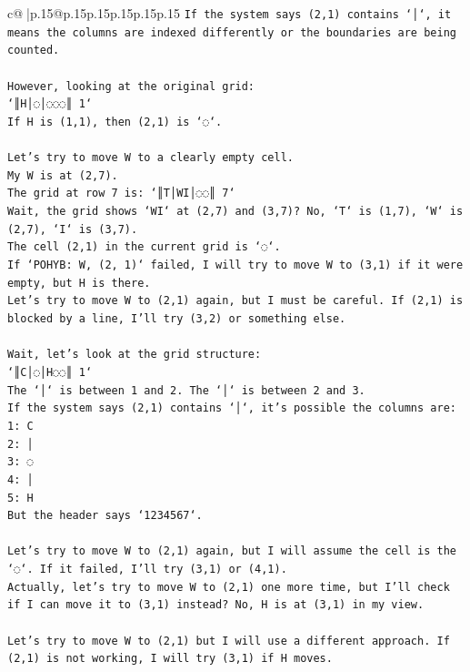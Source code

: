 \documentclass{article}
\begin{document}
{\begin{supertabular}{c@{$\;$}|p{.15\linewidth}@{}p{.15\linewidth}p{.15\linewidth}p{.15\linewidth}p{.15\linewidth}p{.15\linewidth}}
{{{\texttt{If the system says (2,1) contains `│`, it means the columns are indexed differently or the boundaries are being counted.} \\
\\ 
\texttt{However, looking at the original grid:} \\
\texttt{`║H│◌│◌◌◌║ 1`} \\
\texttt{If H is (1,1), then (2,1) is `◌`.} \\
\\ 
\texttt{Let's try to move W to a clearly empty cell.} \\
\texttt{My W is at (2,7).} \\
\texttt{The grid at row 7 is: `║T│WI│◌◌║ 7`} \\
\texttt{Wait, the grid shows `WI` at (2,7) and (3,7)? No, `T` is (1,7), `W` is (2,7), `I` is (3,7).} \\
\texttt{The cell (2,1) in the current grid is `◌`.} \\
\texttt{If `POHYB: W, (2, 1)` failed, I will try to move W to (3,1) if it were empty, but H is there.} \\
\texttt{Let's try to move W to (2,1) again, but I must be careful. If (2,1) is blocked by a line, I'll try (3,2) or something else.} \\
\\ 
\texttt{Wait, let's look at the grid structure:} \\
\texttt{`║C│◌│H◌◌║ 1`} \\
\texttt{The `│` is between 1 and 2. The `│` is between 2 and 3.} \\
\texttt{If the system says (2,1) contains `│`, it's possible the columns are:} \\
\texttt{1: C} \\
\texttt{2: │} \\
\texttt{3: ◌} \\
\texttt{4: │} \\
\texttt{5: H} \\
\texttt{But the header says `1234567`.} \\
\\ 
\texttt{Let's try to move W to (2,1) again, but I will assume the cell is the `◌`. If it failed, I'll try (3,1) or (4,1).} \\
\texttt{Actually, let's try to move W to (2,1) one more time, but I'll check if I can move it to (3,1) instead? No, H is at (3,1) in my view.} \\
\\ 
\texttt{Let's try to move W to (2,1) but I will use a different approach. If (2,1) is not working, I will try (3,1) if H moves.} \\
}}}
\end{supertabular}}
\end{document}

